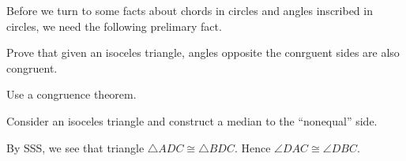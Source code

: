 \documentclass{ximera}
\begin{document}
Before we turn to some facts about chords in circles and angles
inscribed in circles, we need the following prelimary fact.

\begin{problem}
Prove that given an isoceles triangle, angles opposite the conrguent
sides are also congruent.
\begin{hint}
Use a congruence theorem.
\end{hint}
\begin{freeResponse}
Consider an isoceles triangle and construct a median to the
``nonequal'' side.
\begin{image}
\end{image}
By SSS, we see that triangle $\triangle ADC \cong \triangle
BDC$. Hence $\angle DAC \cong \angle DBC$.
\end{freeResponse}
\end{problem}
\end{document}
